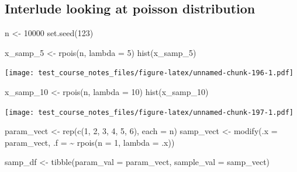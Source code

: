 \documentclass[
]{book}
\newenvironment{Shaded}{\begin{snugshade}}{\end{snugshade}}
\newcommand{\AttributeTok}[1]{\textcolor[rgb]{0.77,0.63,0.00}{#1}}
\newcommand{\DecValTok}[1]{\textcolor[rgb]{0.00,0.00,0.81}{#1}}
\newcommand{\FunctionTok}[1]{\textcolor[rgb]{0.00,0.00,0.00}{#1}}
\newcommand{\NormalTok}[1]{#1}
\newcommand{\OtherTok}[1]{\textcolor[rgb]{0.56,0.35,0.01}{#1}}
\newcommand{\SpecialCharTok}[1]{\textcolor[rgb]{0.00,0.00,0.00}{#1}}
\begin{document}
\hypertarget{interlude-looking-at-poisson-distribution}{%
\subsection{Interlude looking at poisson distribution}\label{interlude-looking-at-poisson-distribution}}

\begin{Shaded}
\begin{Highlighting}[]
\NormalTok{n }\OtherTok{\textless{}{-}} \DecValTok{10000}
\FunctionTok{set.seed}\NormalTok{(}\DecValTok{123}\NormalTok{)}


\NormalTok{x\_samp\_5 }\OtherTok{\textless{}{-}} \FunctionTok{rpois}\NormalTok{(n, }\AttributeTok{lambda =} \DecValTok{5}\NormalTok{)}
\FunctionTok{hist}\NormalTok{(x\_samp\_5)}
\end{Highlighting}
\end{Shaded}

\texttt{[image: test\_course\_notes\_files/figure-latex/unnamed-chunk-196-1.pdf]}

\begin{Shaded}
\begin{Highlighting}[]
\NormalTok{x\_samp\_10 }\OtherTok{\textless{}{-}} \FunctionTok{rpois}\NormalTok{(n, }\AttributeTok{lambda =} \DecValTok{10}\NormalTok{)}
\FunctionTok{hist}\NormalTok{(x\_samp\_10)}
\end{Highlighting}
\end{Shaded}

\texttt{[image: test\_course\_notes\_files/figure-latex/unnamed-chunk-197-1.pdf]}

\begin{Shaded}
\begin{Highlighting}[]
\NormalTok{param\_vect }\OtherTok{\textless{}{-}} \FunctionTok{rep}\NormalTok{(}\FunctionTok{c}\NormalTok{(}\DecValTok{1}\NormalTok{, }\DecValTok{2}\NormalTok{, }\DecValTok{3}\NormalTok{, }\DecValTok{4}\NormalTok{, }\DecValTok{5}\NormalTok{, }\DecValTok{6}\NormalTok{), }\AttributeTok{each =}\NormalTok{ n)}
\NormalTok{samp\_vect }\OtherTok{\textless{}{-}} \FunctionTok{modify}\NormalTok{(}\AttributeTok{.x =}\NormalTok{ param\_vect, }\AttributeTok{.f =} \SpecialCharTok{\textasciitilde{}} \FunctionTok{rpois}\NormalTok{(}\AttributeTok{n =} \DecValTok{1}\NormalTok{, }\AttributeTok{lambda =}\NormalTok{ .x))}
\end{Highlighting}
\end{Shaded}

\begin{Shaded}
\begin{Highlighting}[]
\NormalTok{samp\_df }\OtherTok{\textless{}{-}} \FunctionTok{tibble}\NormalTok{(}\AttributeTok{param\_val =}\NormalTok{ param\_vect,}
                  \AttributeTok{sample\_val =}\NormalTok{ samp\_vect)}
\end{Highlighting}
\end{Shaded}
\end{document}
